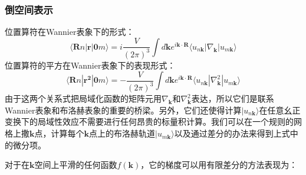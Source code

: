 \subsubsection{倒空间表示}
位置算符在Wannier表象下的形式：
\begin{equation}
\langle \bm{R}n |\bm{r}|\bm{0}m\rangle=i \frac{V}{(2\pi)^3}\int d\bm{k} e^{i \bm{k} \cdot \bm{R}} \langle u_{n \bm{k}}| \nabla_{\bm{k}}| u_{m \bm{k}}\rangle
\end{equation}
位置算符的平方在Wannier表象下的表现形式：
\begin{equation}
\langle \bm{R}n |\bm{r^2}|\bm{0}m\rangle=- \frac{V}{(2\pi)^3}\int d\bm{k} e^{i \bm{k} \cdot \bm{R}} \langle u_{n \bm{k}}| \nabla^2_{\bm{k}}| u_{m \bm{k}}\rangle
\end{equation}
由于这两个关系式把局域化函数的矩阵元用$\nabla_{\bm{k}}$和$ \nabla^2_{\bm{k}}$表达，所以它们是联系Wannier表象和布洛赫表象的重要的桥梁。另外，它们还使得计算$|u_{n\bm{k}}\rangle$在任意幺正变换下的局域性效应不需要进行任何昂贵的标量积计算。我们可以在一个规则的网格上撒$\bm{k}$点，计算每个$\bm{k}$点上的布洛赫轨道$|u_{m\bm{k}}\rangle$以及通过差分的办法来得到上式中的微分项。

对于在$\bm{k}$空间上平滑的任何函数$f(\bm{k})$，它的梯度可以用有限差分的方法表现为：

